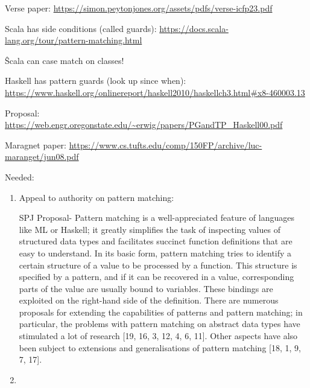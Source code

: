 \documentclass{article}
\begin{document}
Verse paper: 
\url{https://simon.peytonjones.org/assets/pdfs/verse-icfp23.pdf}

Scala has side conditions (called guards): 
\url{https://docs.scala-lang.org/tour/pattern-matching.html}

\^ Scala can case match on classes! 

Haskell has pattern guards (look up since when): 
    \url{https://www.haskell.org/onlinereport/haskell2010/haskellch3.html#x8-460003.13}


Proposal: 
\url{https://web.engr.oregonstate.edu/~erwig/papers/PGandTP_Haskell00.pdf}

Maragnet paper: 
\url{https://www.cs.tufts.edu/comp/150FP/archive/luc-maranget/jun08.pdf}

Needed: 
\begin{enumerate}
    \item Appeal to authority on pattern matching: 
    
    SPJ Proposal- Pattern matching is a well-appreciated feature of languages
    like ML or Haskell; it greatly simplifies the task of inspecting values of
    structured data types and facilitates succinct function definitions that are
    easy to understand. In its basic form, pattern matching tries to identify a
    certain structure of a value to be processed by a function. This structure
    is specified by a pattern, and if it can be recovered in a value,
    corresponding parts of the value are usually bound to variables. These
    bindings are exploited on the right-hand side of the definition. There are
    numerous proposals for extending the capabilities of patterns and pattern
    matching; in particular, the problems with pattern matching on abstract
    data types have stimulated a lot of research [19, 16, 3, 12, 4, 6, 11].
    Other aspects have also been subject to extensions and generalisations of
    pattern matching [18, 1, 9, 7, 17].
    \item 
\end{enumerate}
\end{document}
